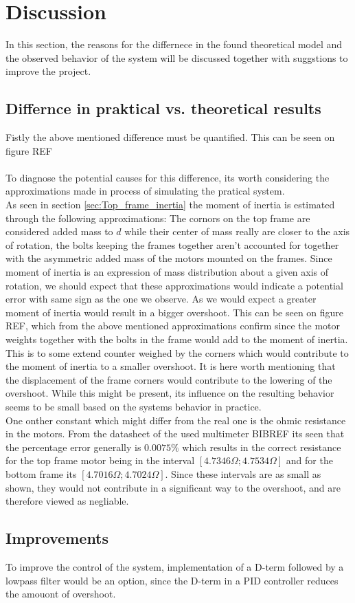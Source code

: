 \documentclass[../../main]{subfiles}
\begin{document}
\section{Discussion}
\label{sec:discussion}
In this section, the reasons for the differnece in the found theoretical model and the observed behavior of the system will be discussed together with suggstions to improve the project.
\subsection{Differnce in praktical vs. theoretical results}
Fistly the above mentioned difference must be quantified. This can be seen on figure REF\\
\\
To diagnose the potential causes for this difference, its worth considering the approximations made in process of simulating the pratical system.\\
As seen in section \ref{sec:Top_frame_inertia} the moment of inertia is estimated through the following approximations: The cornors on the top frame are considered added mass to $d$ while their center of mass really are closer to the axis of rotation, the bolts keeping the frames together aren't accounted for together with the asymmetric added mass of the motors mounted on the frames. Since moment of inertia is an expression of mass distribution about a given axis of rotation, we should expect that these approximations would indicate a potential error with same sign as the one we observe. As we would expect a greater moment of inertia would result in a bigger overshoot. This can be seen on figure REF, which from the above mentioned approximations confirm since the motor weights together with the bolts in the frame would add to the moment of inertia. This is to some extend counter weighed by the corners which would contribute to the moment of inertia to a smaller overshoot. It is here worth mentioning that the displacement of the frame corners would contribute to the lowering of the overshoot. While this might be present, its influence on the resulting behavior seems to be small based on the systems behavior in practice.\\
One onther constant which might differ from the real one is the ohmic resistance in the motors. From the datasheet of the used multimeter BIBREF its seen that the percentage error generally is $0.0075\%$ which results in the correct resistance for the top frame motor being in the interval $[4.7346\Omega;4.7534\Omega]$ and for the bottom frame its $[4.7016\Omega;4.7024\Omega]$. Since these intervals are as small as shown, they would not contribute in a significant way to the overshoot, and are therefore viewed as negliable.\\
\subsection{Improvements}
To improve the control of the system, implementation of a D-term followed by a lowpass filter would be an option, since the D-term in a PID controller reduces the amouont of overshoot.
\end{document}
